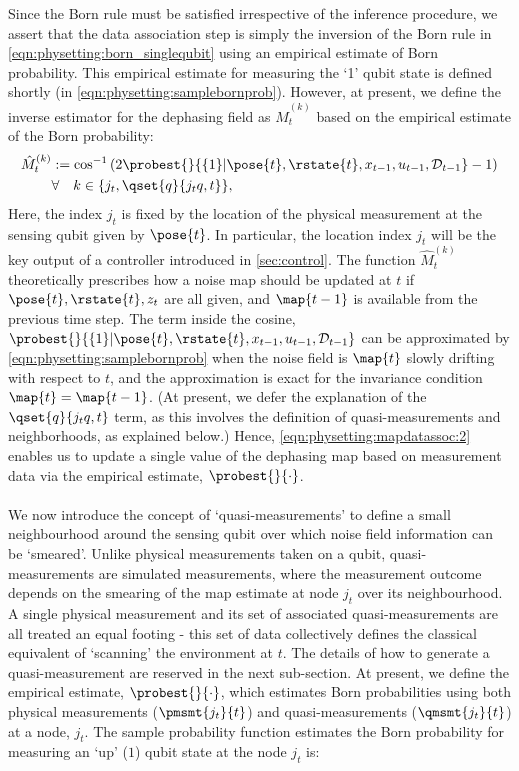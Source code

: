 Since the Born rule must be satisfied irrespective of the inference procedure, we assert that the data association step is simply the inversion of the Born rule in \cref{eqn:physetting:born_singlequbit} using an empirical estimate of Born probability. This empirical estimate for measuring the `1' qubit state is defined shortly (in \cref{eqn:physetting:samplebornprob}). However, at present, we define the inverse estimator for the dephasing field as $\hat{M}_t^{(k)}$ based on the empirical estimate of the Born probability:
\begin{align}
\hat{M}_t^{(k)} &:= \cos^{-1}\left( 2\probest{}{\{1\} | \pose{t}, \rstate{t}, x_{t-1}, u_{t-1}, \mathcal{D}_{t-1}} - 1 \right) \label{eqn:physetting:mapdatassoc:2} \\
& \forall \quad  k \in \{j_t, \qset{q}{j_t q, t } \}, \nonumber 
\end{align} Here, the index $j_t$  is fixed by the location of the physical measurement at the sensing qubit  given by $\pose{t}$. In particular, the location index $j_t$  will be the key output of a controller introduced in \cref{sec:control}. The function  $\hat{M}_t^{(k)}$ theoretically prescribes how a noise map should be updated at $t$ if $\pose{t}, \rstate{t}, z_t$ are all given, and $\map{t-1}$ is available from the previous time step. The term inside the cosine, $\probest{}{\{1\} | \pose{t}, \rstate{t}, x_{t-1}, u_{t-1}, \mathcal{D}_{t-1}}$ can be approximated by \cref{eqn:physetting:samplebornprob} when the noise field is $\map{t}$ slowly drifting with respect to $t$, and the approximation is exact for the invariance condition $\map{t} = \map{t-1}$. (At present, we defer the explanation of the $\qset{q}{j_t q, t } $ term, as this involves the definition of quasi-measurements and neighborhoods, as explained below.) Hence, \cref{eqn:physetting:mapdatassoc:2} enables us to update a single value of the dephasing map based on measurement data via the empirical estimate, $\probest{}{\cdot}$. \\
\\
We now introduce the concept of `quasi-measurements' to define a small neighbourhood around the sensing qubit over which noise field information can be `smeared'. Unlike physical measurements taken on a qubit, quasi-measurements are simulated measurements, where the measurement outcome depends on the smearing of the map estimate at node $j_t$ over its neighbourhood. A single physical measurement and its set of associated quasi-measurements are all treated an equal footing - this set of data collectively defines the classical equivalent of `scanning' the environment at $t$. The details of how to generate a quasi-measurement are reserved in the next sub-section. At present, we define  the empirical estimate, $\probest{}{\cdot}$, which estimates Born probabilities using both physical measurements ($\pmsmt{j_t}{t}$) and quasi-measurements ($\qmsmt{j_t}{t}$) at a node, $j_t$. The sample probability function estimates the Born probability for measuring an `up' ($1$) qubit state at the node $j_t$ is:
